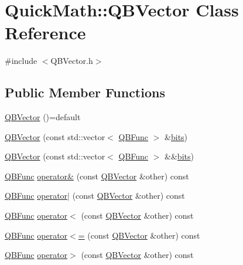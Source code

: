 \hypertarget{classQuickMath_1_1QBVector}{}\section{Quick\+Math\+:\+:Q\+B\+Vector Class Reference}
\label{classQuickMath_1_1QBVector}


{\ttfamily \#include $<$Q\+B\+Vector.\+h$>$}

\subsection*{Public Member Functions}
\begin{DoxyCompactItemize}
\item 
\hyperlink{classQuickMath_1_1QBVector_acc9096f5b85f712f8b6b135e0602cdc3}{Q\+B\+Vector} ()=default
\item 
\hyperlink{classQuickMath_1_1QBVector_a3127e531f0fa4359b9ef9e40b143feb6}{Q\+B\+Vector} (const std\+::vector$<$ \hyperlink{classQuickMath_1_1QBFunc}{Q\+B\+Func} $>$ \&\hyperlink{classQuickMath_1_1QBVector_a6e017544e097d563950754952fa42825}{bits})
\item 
\hyperlink{classQuickMath_1_1QBVector_a9bb76c4861cb54ab76f5cf11ffd3d7f5}{Q\+B\+Vector} (const std\+::vector$<$ \hyperlink{classQuickMath_1_1QBFunc}{Q\+B\+Func} $>$ \&\&\hyperlink{classQuickMath_1_1QBVector_a6e017544e097d563950754952fa42825}{bits})
\item 
\hyperlink{classQuickMath_1_1QBFunc}{Q\+B\+Func} \hyperlink{classQuickMath_1_1QBVector_a7ea835cb224b451dc0527007e668cf71}{operator\&} (const \hyperlink{classQuickMath_1_1QBVector}{Q\+B\+Vector} \&other) const 
\item 
\hyperlink{classQuickMath_1_1QBFunc}{Q\+B\+Func} \hyperlink{classQuickMath_1_1QBVector_ac5e95502680482c2f3b0bbe48f0563d6}{operator$\vert$} (const \hyperlink{classQuickMath_1_1QBVector}{Q\+B\+Vector} \&other) const 
\item 
\hyperlink{classQuickMath_1_1QBFunc}{Q\+B\+Func} \hyperlink{classQuickMath_1_1QBVector_a5246d8a7f9db8da8bc93c305bd1f7ca9}{operator$<$} (const \hyperlink{classQuickMath_1_1QBVector}{Q\+B\+Vector} \&other) const 
\item 
\hyperlink{classQuickMath_1_1QBFunc}{Q\+B\+Func} \hyperlink{classQuickMath_1_1QBVector_a6eecd7ac64f312a95fdfc18f0afdb9a9}{operator$<$=} (const \hyperlink{classQuickMath_1_1QBVector}{Q\+B\+Vector} \&other) const 
\item 
\hyperlink{classQuickMath_1_1QBFunc}{Q\+B\+Func} \hyperlink{classQuickMath_1_1QBVector_a112d9f6bdea9b694624521ec245dcae4}{operator$>$} (const \hyperlink{classQuickMath_1_1QBVector}{Q\+B\+Vector} \&other) const 

\end{DoxyCompactItemize}
